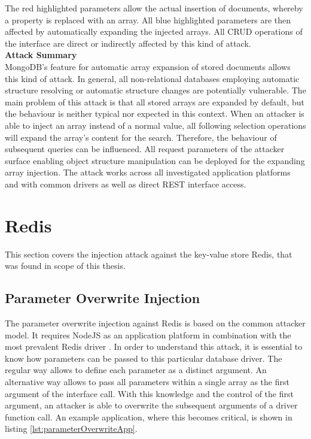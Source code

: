 The red highlighted parameters allow the actual insertion of documents, whereby a property is replaced with an array. All blue highlighted parameters are then affected by automatically expanding the injected arrays. All CRUD operations of the interface are direct or indirectly affected by this kind of attack. \\

\textbf{Attack Summary} \\
MongoDB's feature for automatic array expansion of stored documents allows this kind of attack. In general, all non-relational databases employing automatic structure resolving or automatic structure changes are potentially vulnerable. The main problem of this attack is that all stored arrays are expanded by default, but the behaviour is neither typical nor expected in this context. When an attacker is able to inject an array instead of a normal value, all following selection operations will expand the array's content for the search. Therefore, the behaviour of subsequent queries can be influenced. All request parameters of the attacker surface enabling object structure manipulation can be deployed for the expanding array injection. The attack works across all investigated application platforms and with common drivers as well as direct REST interface access. 

\section{Redis}
This section covers the injection attack against the key-value store Redis, that was found in scope of this thesis.

\subsection{Parameter Overwrite Injection}
The parameter overwrite injection against Redis is based on the common attacker model. It requires NodeJS as an application platform in combination with the most prevalent Redis driver \cite{Ranney2016}. In order to understand this attack, it is essential to know how parameters can be passed to this particular database driver. The regular way allows to define each parameter as a distinct argument. An alternative way allows to pass all parameters within a single array as the first argument of the interface call. With this knowledge and the control of the first argument, an attacker is able to overwrite the subsequent arguments of a driver function call. An example application, where this becomes critical, is shown in listing \ref{lst:parameterOverwriteApp}. \\

